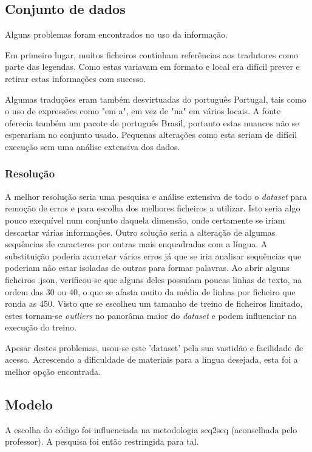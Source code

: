 \documentclass{article}
\begin{document}
\subsection{Conjunto de dados}
Alguns problemas foram encontrados no uso da informação.

Em primeiro lugar, muitos ficheiros continham referências aos tradutores como parte das legendas. Como estas variavam em formato e local era difícil prever e retirar estas informações com sucesso.

Algumas traduções eram também desvirtuadas do português Portugal, tais como o uso de expressões como "em a", em vez de "na" em vários locais. A fonte oferecia também um pacote de português Brasil, portanto estas nuances não se esperariam no conjunto usado. Pequenas alterações como esta seriam de difícil execução sem uma análise extensiva dos dados.

\subsubsection{Resolução}
A melhor resolução seria uma pesquisa e análise extensiva de todo o \textit{dataset} para remoção de erros e para escolha dos melhores ficheiros a utilizar. Isto seria algo pouco exequível num conjunto daquela dimensão, onde certamente se iriam descartar várias informações. Outro solução seria a alteração de algumas sequências de caracteres por outras mais enquadradas com a língua. A substituição poderia acarretar vários erros já que se iria analisar sequências que poderiam não estar isoladas de outras para formar palavras. Ao abrir alguns ficheiros .json, verificou-se que alguns deles possuíam poucas linhas de texto, na ordem das 30 ou 40, o que se afasta muito da média de linhas por ficheiro que ronda as 450. Visto que se escolheu um tamanho de treino de ficheiros limitado, estes tornam-se \textit{outliers} no panorâma maior do \textit{dataset} e podem influenciar na execução do treino. 

Apesar destes problemas, usou-se este 'dataset' pela sua vastidão e facilidade de acesso. Acrescendo a dificuldade de materiais para a língua desejada, esta foi a melhor opção encontrada.

\subsection{Modelo}
A escolha do código foi influenciada na metodologia seq2seq (aconselhada pelo professor). A pesquisa foi então restringida para tal.
\end{document}
